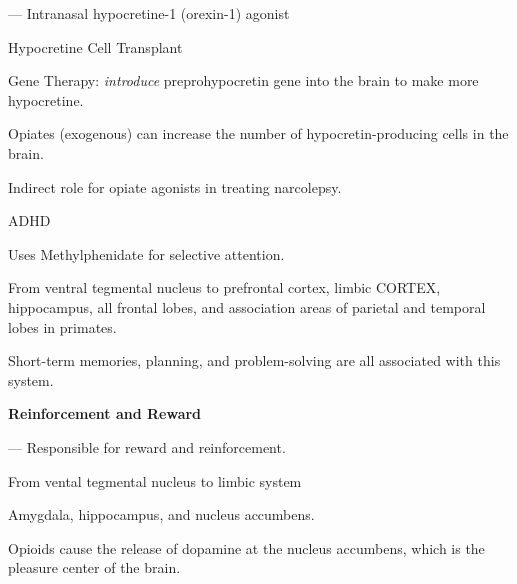 \begin{coloredlist}
\begin{coloredlist}
\begin{coloredlist}
\begin{coloredlist}
                \item {} — Intranasal hypocretine-1 (orexin-1) agonist
                \item Hypocretine Cell Transplant
                \item Gene Therapy: \textit{introduce} preprohypocretin gene into the brain to make more hypocretine.
                \item Opiates (exogenous) can increase the number of hypocretin-producing cells in the brain.
                \item Indirect role for opiate agonists in treating narcolepsy.
            \end{coloredlist}            
        \end{coloredlist}
        \item ADHD
        \begin{coloredlist}
            \item Uses Methylphenidate for selective attention.
        \end{coloredlist}
        \item {}
        \begin{coloredlist}
            \item From ventral tegmental nucleus to prefrontal cortex, limbic CORTEX, hippocampus, all frontal lobes, and association areas of parietal and temporal lobes in primates.
            \item Short-term memories, planning, and problem-solving are all associated with this system.
        \end{coloredlist}
    \end{coloredlist}
    \item \textbf{Reinforcement and Reward}
    \begin{coloredlist}
        \item {} — Responsible for reward and reinforcement.
        \begin{coloredlist}
            \item From vental tegmental nucleus to limbic system
            \begin{coloredlist}
                \item Amygdala, hippocampus, and nucleus accumbens.
                \item Opioids cause the release of dopamine at the nucleus accumbens, which is the pleasure center of the brain.
            \end{coloredlist}

\end{coloredlist}
\end{coloredlist}
\end{coloredlist}
